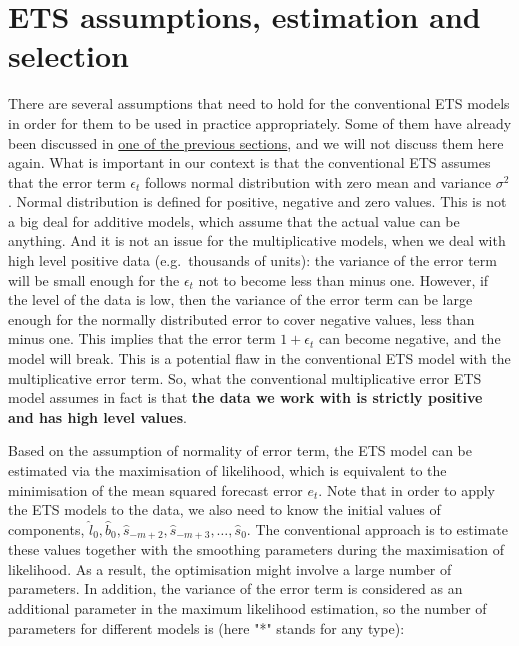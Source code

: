 \documentclass[
]{book}
\theoremstyle{definition}
\theoremstyle{definition}
\theoremstyle{definition}
\theoremstyle{definition}
\theoremstyle{remark}
\begin{document}
\hypertarget{ets-assumptions-estimation-and-selection}{%
\section{ETS assumptions, estimation and selection}\label{ets-assumptions-estimation-and-selection}}

There are several assumptions that need to hold for the conventional ETS models in order for them to be used in practice appropriately. Some of them have already been discussed in \protect\hyperlink{assumptions}{one of the previous sections}, and we will not discuss them here again. What is important in our context is that the conventional ETS assumes that the error term \(\epsilon_t\) follows normal distribution with zero mean and variance \(\sigma^2\). Normal distribution is defined for positive, negative and zero values. This is not a big deal for additive models, which assume that the actual value can be anything. And it is not an issue for the multiplicative models, when we deal with high level positive data (e.g.~thousands of units): the variance of the error term will be small enough for the \(\epsilon_t\) not to become less than minus one. However, if the level of the data is low, then the variance of the error term can be large enough for the normally distributed error to cover negative values, less than minus one. This implies that the error term \(1+\epsilon_t\) can become negative, and the model will break. This is a potential flaw in the conventional ETS model with the multiplicative error term. So, what the conventional multiplicative error ETS model assumes in fact is that \textbf{the data we work with is strictly positive and has high level values}.

Based on the assumption of normality of error term, the ETS model can be estimated via the maximisation of likelihood, which is equivalent to the minimisation of the mean squared forecast error \(e_t\). Note that in order to apply the ETS models to the data, we also need to know the initial values of components, \(\hat{l}_0, \hat{b}_0, \hat{s}_{-m+2}, \hat{s}_{-m+3}, \dots, \hat{s}_{0}\). The conventional approach is to estimate these values together with the smoothing parameters during the maximisation of likelihood. As a result, the optimisation might involve a large number of parameters. In addition, the variance of the error term is considered as an additional parameter in the maximum likelihood estimation, so the number of parameters for different models is (here "*" stands for any type):
\end{document}
